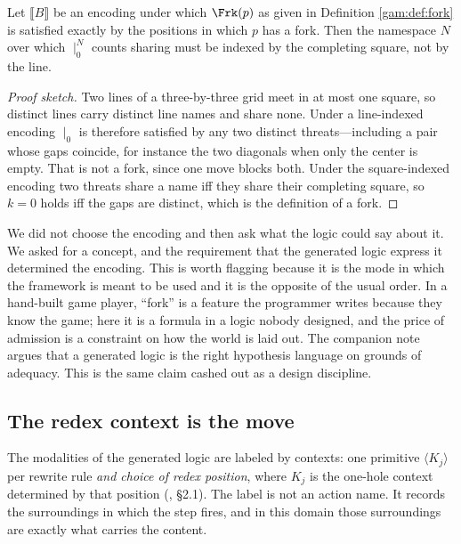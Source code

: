 \begin{proposition}\label{gam:prop:parands}
Let $\llbracket B \rrbracket$ be an encoding under which $\Frk(p)$ as given in
Definition \ref{gam:def:fork} is satisfied exactly by the positions in which $p$ has
a fork. Then the namespace $N$ over which $\mid_0^N$ counts sharing must be
indexed by the completing square, not by the line.
\end{proposition}
\begin{proof}[Proof sketch]
Two lines of a three-by-three grid meet in at most one square, so distinct lines
carry distinct line names and share none. Under a line-indexed encoding $\mid_0$
is therefore satisfied by any two distinct threats---including a pair whose gaps
coincide, for instance the two diagonals when only the center is empty. That is
not a fork, since one move blocks both. Under the square-indexed encoding two
threats share a name iff they share their completing square, so $k=0$ holds iff
the gaps are distinct, which is the definition of a fork.
\end{proof}

\begin{remark}\label{gam:what-just-happened}
We did not choose the encoding and then ask what the logic could say about it.
We asked for a concept, and the requirement that the generated logic express it
determined the encoding. This is worth flagging because it is the mode in which
the framework is meant to be used and it is the opposite of the usual order. In
a hand-built game player, ``fork'' is a feature the programmer writes because
they know the game; here it is a formula in a logic nobody designed, and the
price of admission is a constraint on how the world is laid out. The companion
note argues that a generated logic is the right hypothesis language on grounds
of adequacy. This is the same claim cashed out as a design discipline.
\end{remark}

\subsection{The redex context is the move}\label{gam:sec:K}\label{gam:S4.1}

The modalities of the generated logic are labeled by contexts: one primitive
$\langle K_j\rangle$ per rewrite rule \emph{and choice of redex position}, where
$K_j$ is the one-hole context determined by that position
(\cite{ClassifierNote}, \S2.1). The label is not an action name. It records the
surroundings in which the step fires, and in this domain those surroundings are
exactly what carries the content.

